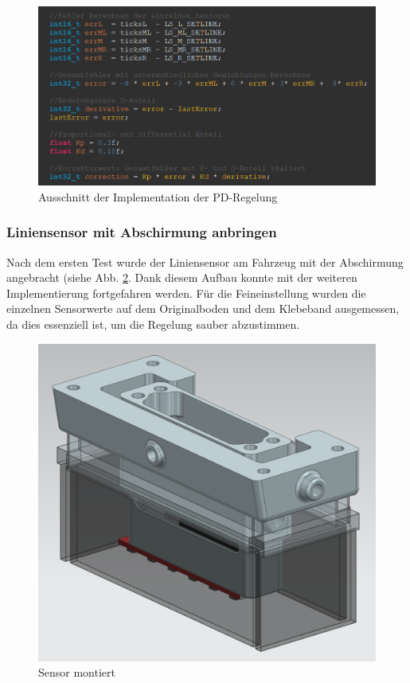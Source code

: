  \begin{figure}[H]
\centering
\includegraphics[width= \textwidth ]{assets/ET/PD-Regler/PD-Regler_Code_Pren2.png}
\caption{Ausschnitt der Implementation der PD-Regelung}
\label{fig:Ausschnitt der Implementation der PD-Regelung}
\end{figure}


\subsubsection{Liniensensor mit Abschirmung anbringen}

Nach dem ersten Test wurde der Liniensensor am Fahrzeug mit der Abschirmung angebracht (siehe Abb. \ref{fig:enter-label}. Dank diesem Aufbau konnte mit der weiteren Implementierung fortgefahren werden. Für die Feineinstellung wurden die einzelnen Sensorwerte auf dem Originalboden und dem Klebeband ausgemessen, da dies essenziell ist, um die Regelung sauber abzustimmen.


\begin{figure}[H]
    \centering
    \includegraphics[width=0.5\linewidth]{Sensor montiert.png}
    \caption{Sensor montiert}
    \label{fig:enter-label}
\end{figure}


